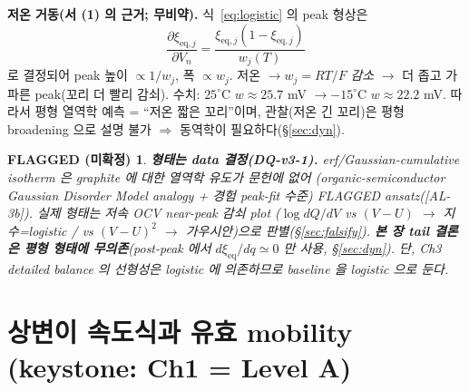 \documentclass[11pt,a4paper]{article}
\newtheorem*{flagbox}{FLAGGED (미확정)}
\newcommand{\eq}{\mathrm{eq}}
\newcommand{\AL}[1]{\textsf{[AL-#1]}}
\begin{document}
\textbf{저온 거동(서 (1) 의 근거; 무비약).} 식~\eqref{eq:logistic} 의 peak 형상은
\begin{equation}
\frac{\partial\xi_{\eq,j}}{\partial V_n}=\frac{\xi_{\eq,j}(1-\xi_{\eq,j})}{w_j(T)}
\label{eq:dxidV}
\end{equation}
로 결정되어 peak 높이 $\propto 1/w_j$, 폭 $\propto w_j$. 저온 $\to w_j=RT/F$ \emph{감소} $\to$ 더 좁고
가파른 peak(꼬리 더 빨리 감쇠). 수치: $25^\circ$C $w\approx25.7$ mV $\to -15^\circ$C $w\approx22.2$ mV.
따라서 평형 열역학 예측 = ``저온 짧은 꼬리''이며, 관찰(저온 긴 꼬리)은 평형 broadening 으로 설명
불가 $\Rightarrow$ 동역학이 필요하다(\S\ref{sec:dyn}).
\begin{flagbox}
\textbf{형태는 data 결정(DQ-v3-1).} erf/Gaussian-cumulative isotherm 은 graphite 에 대한 열역학 유도가
문헌에 없어 (organic-semiconductor Gaussian Disorder Model \cite{baessler1993} analogy + 경험
peak-fit 수준) FLAGGED ansatz(\AL{3b}). 실제 형태는 저속 OCV near-peak 감쇠 plot
($\log dQ/dV$ vs $(V-U)$ $\to$ 지수=logistic / vs $(V-U)^2$ $\to$ 가우시안)으로 판별(\S\ref{sec:falsify}).
\textbf{본 장 tail 결론은 평형 형태에 무의존}(post-peak 에서 $d\xi_\eq/dq\simeq0$ 만 사용,
\S\ref{sec:dyn}). 단, Ch3 detailed balance 의 선형성은 logistic 에 의존하므로 baseline 을 logistic 으로 둔다.
\end{flagbox}

\section{상변이 속도식과 유효 mobility (keystone: Ch1 = Level A)}\label{sec:rate}
\end{document}
